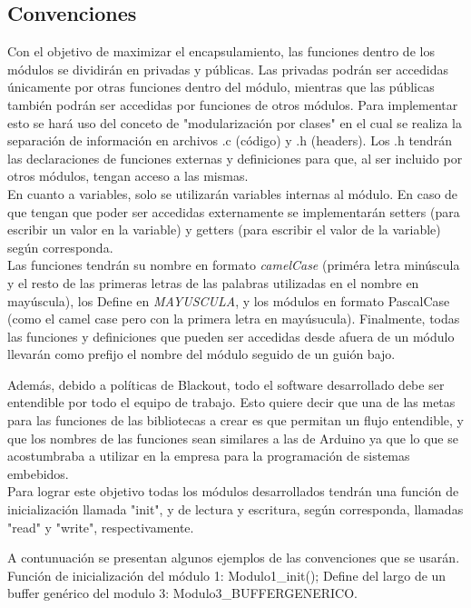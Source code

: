 \subsection{Convenciones}
Con el objetivo de maximizar el encapsulamiento, las funciones dentro de los módulos se dividirán en privadas y públicas. Las privadas podrán ser accedidas únicamente por otras funciones dentro del módulo, mientras que las públicas también podrán ser accedidas por funciones de otros módulos. Para implementar esto se hará uso del conceto de "modularización por clases" \cite{sec2_6_2-1} en el cual se realiza la separación de información en archivos .c (código) y .h (headers). Los .h tendrán las declaraciones de funciones externas y definiciones para que, al ser incluido por otros módulos, tengan acceso a las mismas.\\
En cuanto a variables, solo se utilizarán variables internas al módulo. En caso de que tengan que poder ser accedidas externamente se implementarán setters (para escribir un valor en la variable) y getters (para escribir el valor de la variable) según corresponda.\\
Las funciones tendrán su nombre en formato \textit{camelCase} (priméra letra minúscula y el resto de las primeras letras de las palabras utilizadas en el nombre en mayúscula), los Define en \textit{MAYUSCULA}, y los módulos en formato PascalCase (como el camel case pero con la primera letra en mayúsucula).
Finalmente, todas las funciones y definiciones que pueden ser accedidas desde afuera de un módulo llevarán como prefijo el nombre del módulo seguido de un guión bajo. 

Además, debido a políticas de Blackout, todo el software desarrollado debe ser entendible por todo el equipo de trabajo. Esto quiere decir que una de las metas para las funciones de las bibliotecas a crear es que permitan un flujo entendible, y que los nombres de las funciones sean similares a las de Arduino ya que lo que se acostumbraba a utilizar en la empresa para la programación de sistemas embebidos.\\
Para lograr este objetivo todas los módulos desarrollados tendrán una función de inicialización llamada "init", y de lectura y escritura, según corresponda, llamadas "read" y "write", respectivamente. 

A contunuación se presentan algunos ejemplos de las convenciones que se usarán. Función de inicialización del módulo 1: Modulo1\_init(); Define del largo de un buffer genérico del modulo 3: Modulo3\_BUFFERGENERICO.


